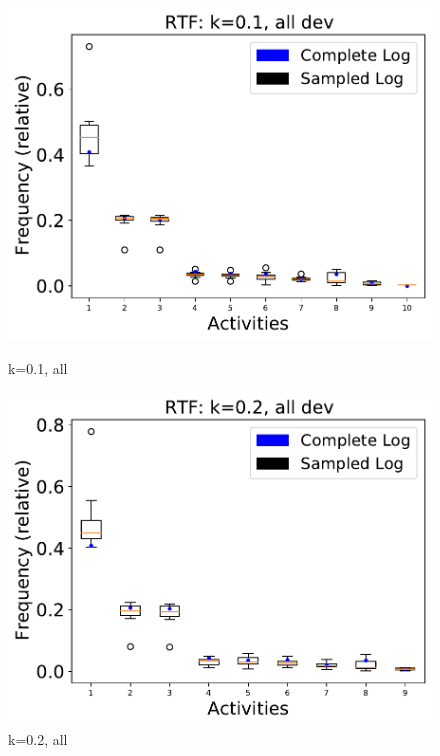 \documentclass[landscape]{article}
\begin{document}
\begin{figure}[!htb]
	\centering
	\begin{minipage}{0.2\textwidth}
		\includegraphics[width=1.0\textwidth]{../Road_Traffic_Fines_Management_Process/Road_Traffic_Fines_Management_Process_deviationsApprox_0.1_NONALIGNING_ALL.pdf}
		\caption{k=0.1, all}
	\end{minipage}
	\hfill
	\begin{minipage}{0.2\textwidth}
		\includegraphics[width=1.0\textwidth]{../Road_Traffic_Fines_Management_Process/Road_Traffic_Fines_Management_Process_deviationsApprox_0.2_NONALIGNING_ALL.pdf}
		\caption{k=0.2, all}
	\end{minipage}

\end{figure}
\end{document}
